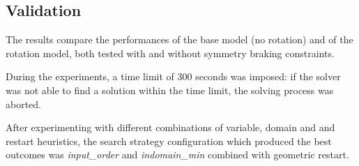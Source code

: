 \subsection{Validation}

The results compare the performances of the base model (no rotation) and of the rotation model, both tested with and without symmetry braking constraints.

During the experiments, a time limit of 300 seconds was imposed: if the solver was not able to find a solution within the time limit, the solving process was aborted.

After experimenting with different combinations of variable, domain and and restart heuristics, the search strategy configuration which produced the best outcomes was \textit{input\_order} and \textit{indomain\_min} combined with geometric restart.


